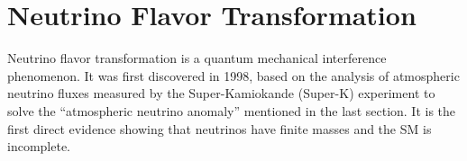 
\section{Neutrino Flavor Transformation}
Neutrino flavor transformation is a quantum mechanical interference phenomenon\cite{akhmedov2019quantum}. It was first discovered in 1998, based on the analysis of atmospheric neutrino fluxes measured by the Super-Kamiokande (Super-K) experiment to solve the ``atmospheric neutrino anomaly'' mentioned in the last section\cite{sect:fukuda1998evidence}. It is the first direct evidence showing that neutrinos have finite masses and the SM is incomplete.

